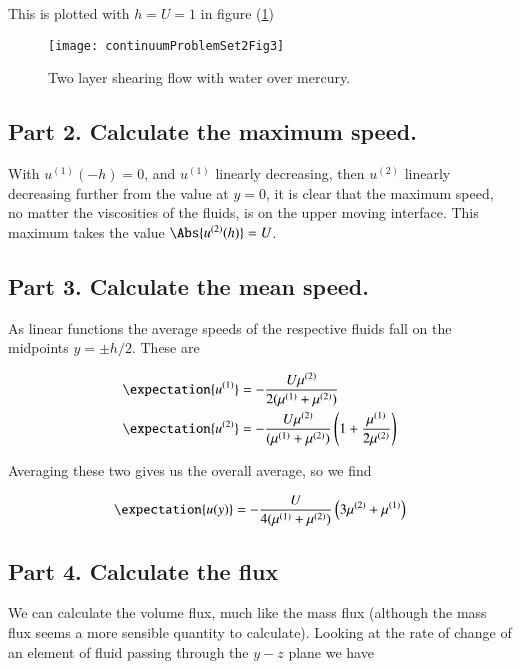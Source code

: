 This is plotted with $h = U = 1$ in figure (\ref{fig:continuumProblemSet2:continuumProblemSet2Fig3})
\begin{figure}[htp]
   \centering
   \texttt{[image: continuumProblemSet2Fig3]}
   \caption{Two layer shearing flow with water over mercury.}\label{fig:continuumProblemSet2:continuumProblemSet2Fig3}
\end{figure}

\subsection{Part 2.  Calculate the maximum speed.}

With $u^{(1)}(-h) = 0$, and $u^{(1)}$ linearly decreasing, then $u^{(2)}$ linearly decreasing further from the value at $y = 0$, it is clear that the maximum speed, no matter the viscosities of the fluids, is on the upper moving interface.  This maximum takes the value $\Abs{u^{(2)}(h)} = U$.

\subsection{Part 3.  Calculate the mean speed.}

As linear functions the average speeds of the respective fluids fall on the midpoints $y = \pm h/2$.  These are

\begin{align}\label{eqn:continuumProblemSet2:660}
\expectation{u^{(1)}} &= -\frac{U \mu^{(2)} }{ 2 (\mu^{(1)} + \mu^{(2)})} \\
\expectation{u^{(2)}} &= -\frac{U \mu^{(2)} }{(\mu^{(1)} + \mu^{(2)})} \left( 1 + \frac{\mu^{(1)}}{2 \mu^{(2)}} \right) 
\end{align}

Averaging these two gives us the overall average, so we find

\begin{equation}\label{eqn:continuumProblemSet2:680}
\expectation{u(y)} = 
-\frac{U }{ 4 (\mu^{(1)} + \mu^{(2)})} \left( 3 \mu^{(2)} + \mu^{(1)} \right) 
\end{equation}

\subsection{Part 4.  Calculate the flux}

We can calculate the volume flux, much like the mass flux (although the mass flux seems a more sensible quantity to calculate).  Looking at the rate of change of an element of fluid passing through the $y-z$ plane we have

